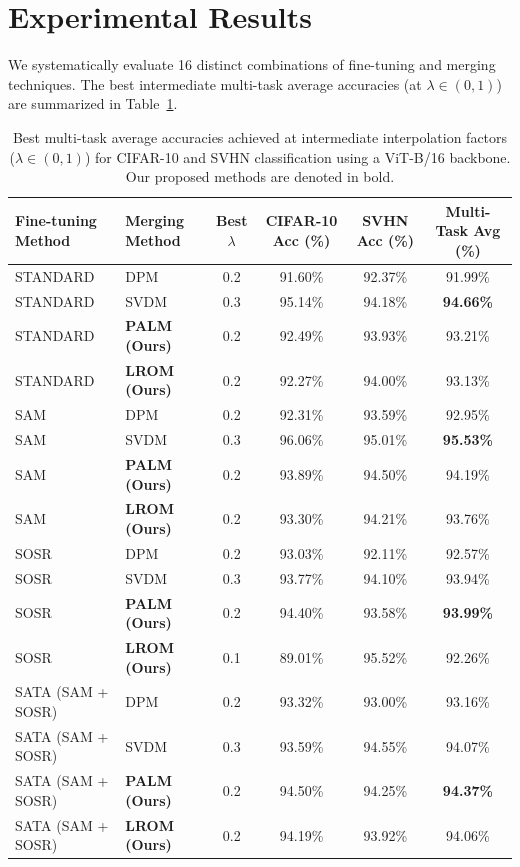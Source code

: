 \documentclass{article}
\theoremstyle{plain}
\theoremstyle{definition}
\theoremstyle{remark}
\begin{document}
\section{Experimental Results}
\label{sec:results}

We systematically evaluate 16 distinct combinations of fine-tuning and merging techniques. The best intermediate multi-task average accuracies (at $\lambda \in (0, 1)$) are summarized in Table~\ref{tab:main_results}.

\begin{table}[t]
\caption{Best multi-task average accuracies achieved at intermediate interpolation factors ($\lambda \in (0, 1)$) for CIFAR-10 and SVHN classification using a ViT-B/16 backbone. Our proposed methods are denoted in bold.}
\label{tab:main_results}
\begin{center}
\begin{small}
\begin{tabular}{llcccc}
\toprule
\textbf{Fine-tuning Method} & \textbf{Merging Method} & \textbf{Best $\lambda$} & \textbf{CIFAR-10 Acc (\%)} & \textbf{SVHN Acc (\%)} & \textbf{Multi-Task Avg (\%)} \\
\midrule
STANDARD & DPM & 0.2 & 91.60\% & 92.37\% & 91.99\% \\
STANDARD & SVDM & 0.3 & 95.14\% & 94.18\% & \textbf{94.66\%} \\
STANDARD & \textbf{PALM (Ours)} & 0.2 & 92.49\% & 93.93\% & 93.21\% \\
STANDARD & \textbf{LROM (Ours)} & 0.2 & 92.27\% & 94.00\% & 93.13\% \\
\midrule
SAM & DPM & 0.2 & 92.31\% & 93.59\% & 92.95\% \\
SAM & SVDM & 0.3 & 96.06\% & 95.01\% & \textbf{95.53\%} \\
SAM & \textbf{PALM (Ours)} & 0.2 & 93.89\% & 94.50\% & 94.19\% \\
SAM & \textbf{LROM (Ours)} & 0.2 & 93.30\% & 94.21\% & 93.76\% \\
\midrule
SOSR & DPM & 0.2 & 93.03\% & 92.11\% & 92.57\% \\
SOSR & SVDM & 0.3 & 93.77\% & 94.10\% & 93.94\% \\
SOSR & \textbf{PALM (Ours)} & 0.2 & 94.40\% & 93.58\% & \textbf{93.99\%} \\
SOSR & \textbf{LROM (Ours)} & 0.1 & 89.01\% & 95.52\% & 92.26\% \\
\midrule
SATA (SAM + SOSR) & DPM & 0.2 & 93.32\% & 93.00\% & 93.16\% \\
SATA (SAM + SOSR) & SVDM & 0.3 & 93.59\% & 94.55\% & 94.07\% \\
SATA (SAM + SOSR) & \textbf{PALM (Ours)} & 0.2 & 94.50\% & 94.25\% & \textbf{94.37\%} \\
SATA (SAM + SOSR) & \textbf{LROM (Ours)} & 0.2 & 94.19\% & 93.92\% & 94.06\% \\
\bottomrule
\end{tabular}
\end{small}
\end{center}
\end{table}
\end{document}
